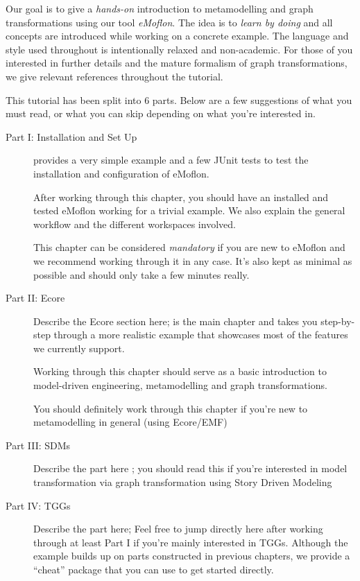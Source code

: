 Our goal is to give a \emph{hands-on} introduction to metamodelling and graph transformations using our tool \emph{eMoflon}.
The idea is to \emph{learn by doing} and all concepts are introduced while working on a concrete example.
The language and style used throughout is intentionally relaxed and non-academic.
For those of you interested in further details and the mature formalism of graph transformations, we give relevant references throughout the tutorial.

This tutorial has been split into 6 parts. Below are a few suggestions of what you must read, or what you can skip depending on what you're interested in.
 
\begin{description}

\item[Part I: Installation and Set Up]provides a very simple example and a few JUnit tests to test the installation and configuration of eMoflon.
 
After working through this chapter, you should have an installed and tested eMoflon working for a trivial example.
We also explain the general workflow and the different workspaces involved.

This chapter can be considered \emph{mandatory} if you are new to eMoflon and we recommend working through it in any case.
It's also kept as minimal as possible and should only take a few minutes really.

\item[Part II: Ecore]  Describe the Ecore section here; is the main chapter and takes you step-by-step through a more realistic example that showcases most of the features we currently support.

Working through this chapter should serve as a basic introduction to model-driven engineering, metamodelling and graph transformations.

You should definitely work through this chapter if you're new to metamodelling in general (using Ecore/EMF)

\item[Part III: SDMs] Describe the part here ; you should read this if you're interested in model transformation via graph transformation using Story Driven Modeling

\item[Part IV: TGGs] Describe the part here; Feel free to jump directly here after working through at least Part I if you're mainly interested in TGGs.
Although the example builds up on parts constructed in previous chapters, we provide a ``cheat'' package that you can use to get started directly.


\end{description}
